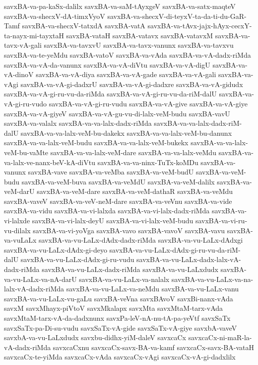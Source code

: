 {savxBA-va-pa-kaSx-dalilx
savxBA-va-saM-tAyxgeV
savxBA-va-satx-maqteV
savxBA-va-shecxV-dA-timxVyoV
savxBA-va-shecxV-di-teyxV-ta-da-ti-du-GaR-Tamf
savxBA-va-shecxV-tatxdA
savxBA-vatA
savxBA-va-tAvx-jajx-hAyx-cecxY-ta-nayx-mi-tayxtaH
savxBA-vataH
savxBA-vatavx
savxBA-vatavxM
savxBA-va-tavx-vA-gali
savxBA-va-tavxvU
savxBA-va-tavx-vanunx
savxBA-va-tavxvu
savxBA-va-te-yeMdu
savxBA-vatoV
savxBA-va-vAda
savxBA-va-vA-dadx-riMda
savxBA-va-vA-da-vanunx
savxBA-va-vA-diVtu
savxBA-va-vA-digU
savxBA-va-vA-dinoV
savxBA-va-vA-diya
savxBA-va-vA-gade
savxBA-va-vA-gali
savxBA-va-vAgi
savxBA-va-vA-gi-dadxrU
savxBA-va-vA-gi-dadxre
savxBA-va-vA-gidudx
savxBA-va-vA-gi-ru-vu-da-riMda
savxBA-va-vA-gi-ru-vu-da-riM-dalU
savxBA-va-vA-gi-ru-vudo
savxBA-va-vA-gi-ru-vudu
savxBA-va-vA-give
savxBA-va-vA-giye
savxBA-va-vA-giyeV
savxBA-va-vA-gu-vu-di-lalx-veM-budu
savxBA-vavU
savxBA-va-valalx
savxBA-va-va-lalx-dadx-riMda
savxBA-va-va-lalx-dadx-riM-dalU
savxBA-va-va-lalx-veM-bu-dakekx
savxBA-va-va-lalx-veM-bu-danunx
savxBA-va-va-lalx-veM-budu
savxBA-va-va-lalx-veM-bukekx
savxBA-va-va-lalx-veM-bu-vaMte
savxBA-va-va-lalx-veM-dare
savxBA-va-va-lalx-veMdu
savxBA-va-va-lalx-ve-nanx-beV-kA-diVtu
savxBA-va-va-ninx-TuTx-koMDu
savxBA-va-vanunx
savxBA-vave
savxBA-va-veMba
savxBA-va-veM-budU
savxBA-va-veM-budu
savxBA-va-veM-buva
savxBA-va-veMdU
savxBA-va-veM-dalilx
savxBA-va-veM-darU
savxBA-va-veM-dare
savxBA-va-veM-dathaR
savxBA-va-veMdu
savxBA-vaveV
savxBA-va-veV-neM-dare
savxBA-va-veVnu
savxBA-va-vide
savxBA-va-vidu
savxBA-va-vi-lalxda
savxBA-va-vi-lalx-dadx-riMda
savxBA-va-vi-lalxde
savxBA-va-vi-lalx-deyU
savxBA-va-vi-lalx-veM-budu
savxBA-va-vi-ru-vu-dilalx
savxBA-va-vi-yoVga
savxBA-vavo
savxBA-vavoV
savxBA-vavu
savxBA-va-vuLaLx
savxBA-va-vu-LaLx-dAdx-dadx-riMda
savxBA-va-vu-LaLx-dAdxgi
savxBA-va-vu-LaLx-dAdx-gi-deyo
savxBA-va-vu-LaLx-dAdx-gi-ru-vu-da-riM-dalU
savxBA-va-vu-LaLx-dAdx-gi-ru-vudu
savxBA-va-vu-LaLx-dadx-lalx-vA-dadx-riMda
savxBA-va-vu-LaLx-dadx-riMda
savxBA-va-vu-LaLxdudx
savxBA-va-vu-LaLx-va-nA-darU
savxBA-va-vu-LaLx-va-nalalx
savxBA-va-vu-LaLx-va-na-lalx-vA-dadx-riMda
savxBA-va-vu-LaLx-va-neMdu
savxBA-va-vu-LaLx-vanu
savxBA-va-vu-LaLx-vu-gaLu
savxBA-veVna
savxBAvoV
savxBi-nanx-vAda
savxM
savxMhayx-piVtoV
savxMkalapx
savxMta
savxMtaM-tarx-vAda
savxMtaM-tarx-vA-da-dadxnunx
savxPa-leV-nA-nu-tA-pa-yeVtf
savxSaTx
savxSaTx-pa-Di-su-vudu
savxSaTx-vA-gide
savxSaTx-vA-giye
savxbA-vaveV
savxbA-va-vu-LaLxdudx
savxbu-didhx-yiM-daleV
savxcaCx
savxcaCx-ni-maR-la-vA-dadx-riMda
savxcaCxnu
savxcaCx-savx-BA-va-kamf
savxcaCx-savx-BA-vataH
savxcaCx-te-yiMda
savxcaCx-vAda
savxcaCx-vAgi
savxcaCx-vA-gi-dadxlilx
}
